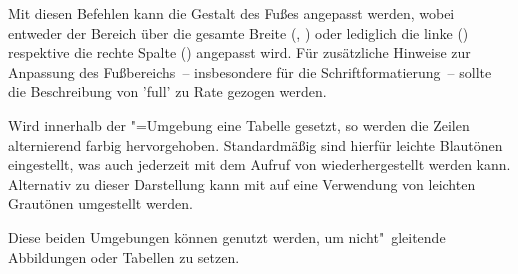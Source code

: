 \begin{DeclareEntity}{}
\begin{Declaration}
\begin{Declaration}
\begin{Declaration}
\begin{Declaration}
Mit diesen Befehlen kann die Gestalt des Fußes angepasst werden, wobei entweder 
der Bereich über die gesamte Breite (, ) 
oder lediglich die linke () respektive die rechte Spalte 
() angepasst wird. Für zusätzliche Hinweise zur Anpassung 
des Fußbereichs~-- insbesondere für die Schriftformatierung~-- sollte die 
Beschreibung von 'full' zu Rate gezogen werden.
\end{Declaration}
\end{Declaration}
\end{Declaration}
\end{Declaration}

\begin{Declaration}
  {}
\begin{Declaration}
  {}
\begin{Declaration}
  {}
\printdeclarationlist

Wird innerhalb der "=Umgebung eine Tabelle gesetzt, 
so werden die Zeilen alternierend farbig hervorgehoben. Standardmäßig sind 
hierfür leichte Blautönen eingestellt, was auch jederzeit mit dem Aufruf von 
 wiederhergestellt werden kann. Alternativ zu dieser 
Darstellung kann mit  auf eine Verwendung von leichten 
Grautönen umgestellt werden.
\end{Declaration}
\end{Declaration}
\end{Declaration}

\begin{Declaration}
  {}
\begin{Declaration}
  {}
\printdeclarationlist

Diese beiden Umgebungen können genutzt werden, um nicht"~gleitende Abbildungen 
oder Tabellen zu setzen.
\end{Declaration}
\end{Declaration}

\begin{Declaration}
  {}
\printdeclarationlist


\end{Declaration}
\end{DeclareEntity}
